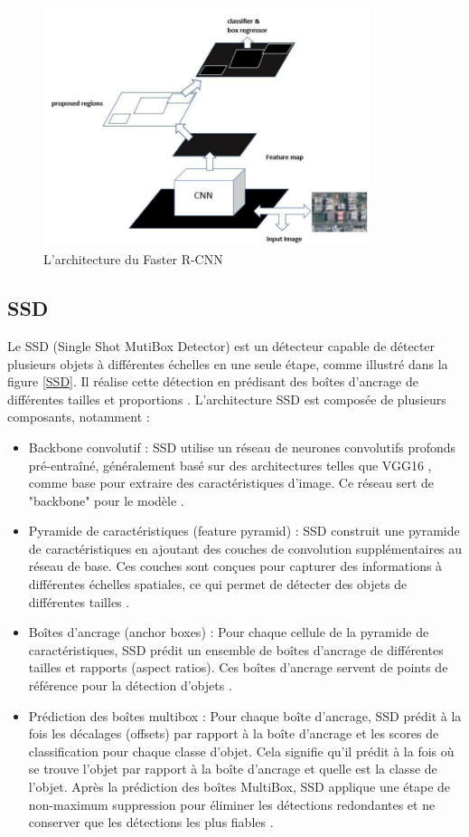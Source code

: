 \begin{figure}[H]
	\centering
	\includegraphics[height=07cm]{img/Faster-R-CNN2.png}
	\caption{L'architecture du Faster R-CNN}
 \label{FasterRCNN}
\end{figure}

\subsection{SSD}
Le SSD (Single Shot MutiBox Detector) est un détecteur capable de détecter plusieurs objets à différentes échelles en une seule étape, comme illustré dans la figure \ref{SSD}. Il réalise cette détection en prédisant des boîtes d'ancrage de différentes tailles et proportions \cite{liu2016ssd}. L'architecture SSD  est composée de plusieurs composants, notamment :
\begin{itemize}
    \item Backbone convolutif : SSD utilise un réseau de neurones convolutifs profonds pré-entraîné, généralement basé sur des architectures telles que VGG16 , comme base pour extraire des caractéristiques d'image. Ce réseau sert de "backbone" pour le modèle \cite{ch2_The5Comp69}.
    \item Pyramide de caractéristiques (feature pyramid) : SSD construit une pyramide de caractéristiques en ajoutant des couches de convolution supplémentaires au réseau de base. Ces couches sont conçues pour capturer des informations à différentes échelles spatiales, ce qui permet de détecter des objets de différentes tailles \cite{ch2_The5Comp69}.
    \item Boîtes d'ancrage (anchor boxes) : Pour chaque cellule de la pyramide de caractéristiques, SSD prédit un ensemble de boîtes d'ancrage de différentes tailles et rapports (aspect ratios). Ces boîtes d'ancrage servent de points de référence pour la détection d'objets \cite{ch2_The5Comp69}.
    \item Prédiction des boîtes multibox : Pour chaque boîte d'ancrage, SSD prédit à la fois les décalages (offsets) par rapport à la boîte d'ancrage et les scores de classification pour chaque classe d'objet. Cela signifie qu'il prédit à la fois où se trouve l'objet par rapport à la boîte d'ancrage et quelle est la classe de l'objet.
    Après la prédiction des boîtes MultiBox, SSD applique une étape de non-maximum suppression pour éliminer les détections redondantes et ne conserver que les détections les plus fiables \cite{ch2_The5Comp69}.
\end{itemize}

